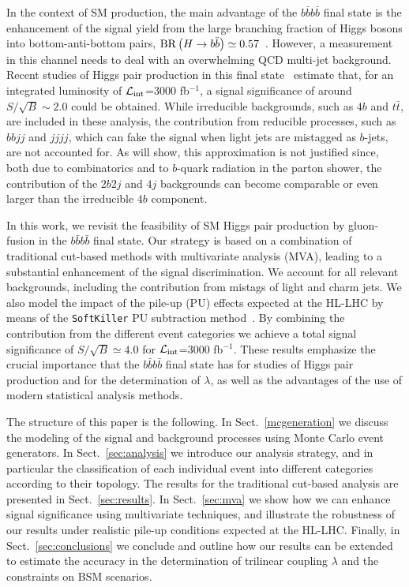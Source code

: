 In the context of SM production,
the main advantage of the $b\bar{b}b\bar{b}$ final state is the
enhancement of the signal yield
from the large branching fraction of Higgs bosons into bottom-anti-bottom
pairs, ${\rm BR}\left( H\to b\bar{b}\right)\simeq 0.57$~\cite{Dittmaier:2012vm}.
%
However, a measurement in this channel
needs to deal with an overwhelming QCD multi-jet background.
%
Recent studies of Higgs pair production in this
final state~\cite{Wardrope:2014kya,deLima:2014dta}
estimate that, for an integrated
luminosity of
$\mathcal{L}_{\rm int}$=3000 fb$^{-1}$,
a signal significance of around $S/\sqrt{B}\sim 2.0$ could be obtained.
%
While irreducible backgrounds, such as $4b$ and
$t\bar{t}$, are included in these analysis, the contribution
from reducible processes, such as $bbjj$ and
$jjjj$, which can fake the signal when 
light jets are mistagged as $b$-jets, are not accounted for.
%
As will show, this approximation is not justified since, both due to
combinatorics and to $b$-quark radiation in the
parton shower, the
contribution of the $2b2j$ and $4j$ backgrounds can become comparable or even larger
than the irreducible $4b$ component.

In this work, we revisit the feasibility of SM Higgs pair production by gluon-fusion
in the $b\bar{b}b\bar{b}$ final state.
%
 Our strategy is based on a combination of traditional cut-based
 methods with multivariate analysis (MVA),
 leading to a substantial
  enhancement of the signal discrimination.
  We account for  all relevant
  backgrounds, including the contribution from mistags of
  light and charm jets.
  We also model the impact of the pile-up (PU) effects expected at the
  HL-LHC by means of the {\tt SoftKiller} PU subtraction
  method~\cite{Cacciari:2014gra}.
  By combining the contribution from
 the different event categories
  we achieve a total signal significance of $S/\sqrt{B}\simeq 4.0$
  for $\mathcal{L}_{\rm int}$=3000 fb$^{-1}$.
%
  These results emphasize the crucial importance that the $b\bar{b}b\bar{b}$ final state
  has for studies of Higgs pair production and for the determination of
  $\lambda$, as well as the advantages of the use of modern statistical
  analysis methods.
  
  
The structure of this paper is the following.
%
In Sect.~\ref{mcgeneration} we discuss the modeling of the signal
and background processes using Monte Carlo event generators.
%
In Sect.~\ref{sec:analysis}
we introduce our analysis strategy, and in particular
the classification of each individual event into
different categories according to their topology.
%
The results for the traditional cut-based analysis
are presented in Sect.~\ref{sec:results}.
%
In Sect.~\ref{sec:mva} we show how we can enhance signal
significance using multivariate techniques, and
illustrate the robustness of our results under realistic pile-up
conditions expected at the HL-LHC.
%
Finally, in Sect.~\ref{sec:conclusions} we conclude and outline
how our results can be extended to estimate the accuracy
in the determination of trilinear coupling $\lambda$ and the constraints on
BSM scenarios.

